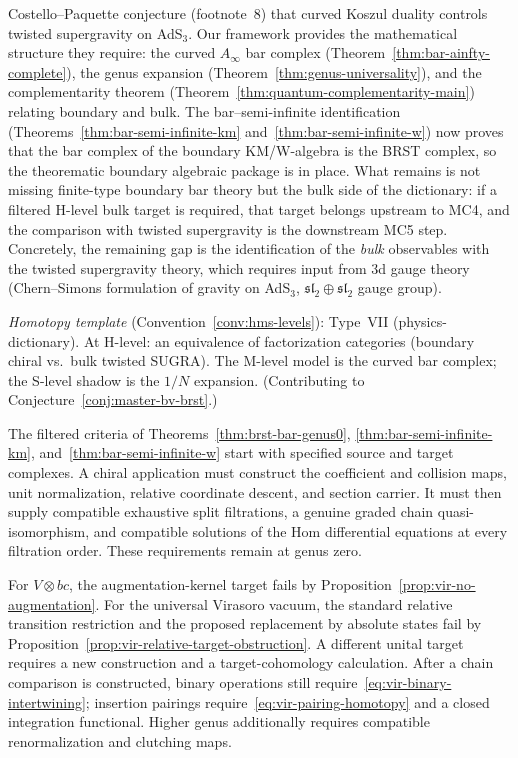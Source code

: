 \begin{remark}[Scope]\label{rem:ads-scope}
Costello--Paquette \cite{CP2020} conjecture (footnote~8) that
curved Koszul duality controls twisted supergravity on AdS$_3$.
Our framework provides the mathematical structure they require:
the curved $A_\infty$ bar complex
(Theorem~\ref{thm:bar-ainfty-complete}), the genus expansion
(Theorem~\ref{thm:genus-universality}), and the
complementarity theorem (Theorem~\ref{thm:quantum-complementarity-main})
relating boundary and bulk.  The bar--semi-infinite identification
(Theorems~\ref{thm:bar-semi-infinite-km}
and~\ref{thm:bar-semi-infinite-w}) now proves that the bar
complex of the boundary KM/W-algebra is the BRST complex, so the
theorematic boundary algebraic package is in place.  What remains is
not missing finite-type boundary bar theory but the bulk side of the
dictionary: if a filtered H-level bulk target is required, that target
belongs upstream to MC4, and the comparison with twisted supergravity
is the downstream MC5 step.  Concretely, the remaining gap is the
identification of the \emph{bulk} observables with the twisted
supergravity theory, which requires input from 3d gauge theory
(Chern--Simons formulation of gravity on AdS$_3$,
$\mathfrak{sl}_2 \oplus \mathfrak{sl}_2$ gauge group).

\emph{Homotopy template} (Convention~\ref{conv:hms-levels}): Type~VII (physics-dictionary).
At H-level: an equivalence of factorization categories (boundary
chiral vs.\ bulk twisted SUGRA).  The M-level model is the curved
bar complex; the S-level shadow is the $1/N$ expansion.
(Contributing to Conjecture~\ref{conj:master-bv-brst}.)
\end{remark}

\begin{remark}\label{rem:brst-chain-map-pieces}
The filtered criteria of Theorems~\ref{thm:brst-bar-genus0}, \ref{thm:bar-semi-infinite-km}, and~\ref{thm:bar-semi-infinite-w} start with specified source and target complexes.
A chiral application must construct the coefficient and collision maps, unit normalization, relative coordinate descent, and section carrier.
It must then supply compatible exhaustive split filtrations, a genuine graded chain quasi-isomorphism, and compatible solutions of the Hom differential equations at every filtration order.
These requirements remain at genus zero.

For $V\otimes bc$, the augmentation-kernel target fails by Proposition~\ref{prop:vir-no-augmentation}.
For the universal Virasoro vacuum, the standard relative transition restriction and the proposed replacement by absolute states fail by Proposition~\ref{prop:vir-relative-target-obstruction}.
A different unital target requires a new construction and a target-cohomology calculation.
After a chain comparison is constructed, binary operations still require~\eqref{eq:vir-binary-intertwining}; insertion pairings require~\eqref{eq:vir-pairing-homotopy} and a closed integration functional.
Higher genus additionally requires compatible renormalization and clutching maps.
\end{remark}

